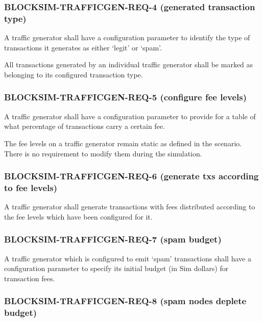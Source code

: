 \documentclass{scrreprt}
\begin{document}
      \subsubsection{BLOCKSIM-TRAFFICGEN-REQ-4 (generated transaction type)}

        A traffic generator shall have a configuration parameter to
        identify the type of transactions it generates as either `legit' or
        `spam'.

        All transactions generated by an individual traffic generator shall
        be marked as belonging to its configured transaction type.

      \subsubsection{BLOCKSIM-TRAFFICGEN-REQ-5 (configure fee levels)}

        A traffic generator shall have a configuration parameter to
        provide for a table of what percentage of transactions carry a certain
        fee.

        The fee levels on a traffic generator remain static as defined in the
        scenario.
        There is no requirement to modify them during the simulation.

      \subsubsection{BLOCKSIM-TRAFFICGEN-REQ-6 (generate txs according to fee levels)}

        A traffic generator shall generate transactions with fees distributed
        according to the fee levels which have been configured for it.

      \subsubsection{BLOCKSIM-TRAFFICGEN-REQ-7 (spam budget)}

        A traffic generator which is configured to emit `spam' transactions
        shall have a configuration parameter to specify its initial budget
        (in Sim dollars) for transaction fees.

      \subsubsection{BLOCKSIM-TRAFFICGEN-REQ-8 (spam nodes deplete budget)}
\end{document}
